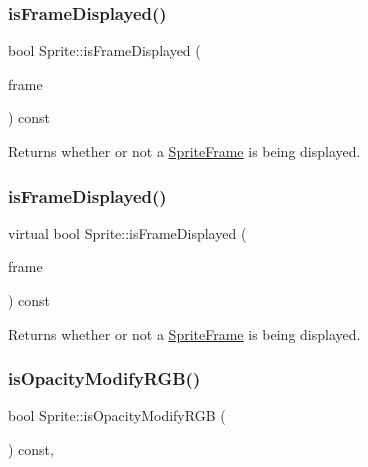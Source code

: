 \subsubsection{\texorpdfstring{is\+Frame\+Displayed()}{isFrameDisplayed()}\hspace{0.1cm}{\footnotesize\ttfamily [1/2]}}
{\footnotesize\ttfamily bool Sprite\+::is\+Frame\+Displayed (\begin{DoxyParamCaption}\item[{\hyperlink{classSpriteFrame}{Sprite\+Frame} $\ast$}]{frame }\end{DoxyParamCaption}) const\hspace{0.3cm}{\ttfamily [virtual]}}

Returns whether or not a \hyperlink{classSpriteFrame}{Sprite\+Frame} is being displayed. \mbox{\label{classSprite_a9fba3e039bf9d72552848a201b4a451f}} 
\subsubsection{\texorpdfstring{is\+Frame\+Displayed()}{isFrameDisplayed()}\hspace{0.1cm}{\footnotesize\ttfamily [2/2]}}
{\footnotesize\ttfamily virtual bool Sprite\+::is\+Frame\+Displayed (\begin{DoxyParamCaption}\item[{\hyperlink{classSpriteFrame}{Sprite\+Frame} $\ast$}]{frame }\end{DoxyParamCaption}) const\hspace{0.3cm}{\ttfamily [virtual]}}

Returns whether or not a \hyperlink{classSpriteFrame}{Sprite\+Frame} is being displayed. \mbox{\label{classSprite_a00d162b3e55fc5acd56e5c3e48bc0a97}} 
\subsubsection{\texorpdfstring{is\+Opacity\+Modify\+R\+G\+B()}{isOpacityModifyRGB()}\hspace{0.1cm}{\footnotesize\ttfamily [1/2]}}
{\footnotesize\ttfamily bool Sprite\+::is\+Opacity\+Modify\+R\+GB (\begin{DoxyParamCaption}\item[{void}]{ }\end{DoxyParamCaption}) const\hspace{0.3cm}{\ttfamily [override]}, {\ttfamily [virtual]}}

